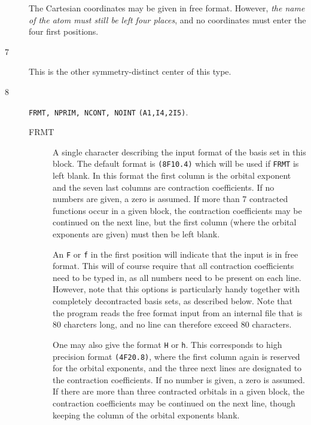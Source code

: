 \begin{description}
\begin{description}
\end{description}
The Cartesian coordinates may
be given in free format. However, {\em the name of the atom must still be
left four places}, and no coordinates must enter the four first
positions. 
\item[7] This is the other symmetry-distinct center of this type.
\item[8] \verb|FRMT, NPRIM, NCONT, NOINT| {\tt (A1,I4,2I5)}.
\begin{description}
\item[FRMT] A single character describing the input format of the
basis set in this block. The default format is {\tt (8F10.4)} which
will be used if {\tt FRMT} is left blank. In this format
the first column is the orbital exponent and the seven last columns
are contraction coefficients. If no numbers are given, a zero is
assumed. If more than 7 contracted functions occur in a given block,
the contraction coefficients may be continued on the next line, but
the first column (where the orbital exponents are given) must then be
left blank.

An {\tt F} or {\tt f} in the first
position will indicate that the input is in free format. This will of
course require that all contraction coefficients need to be typed in,
as all numbers need to be present on each line. However, note that
this options is particularly handy together with completely
decontracted basis sets, as described below. Note that the program
reads the free format input from an internal file that is 80 charcters
long, and no line can therefore exceed 80 characters.

One may also give the format {\tt H} or {\tt h}. This corresponds to
high precision format {\tt (4F20.8)}, where the first column again is
reserved for the orbital exponents, and the three next lines are
designated to the contraction coefficients. If no number is given, a zero
is assumed. If there are more than three contracted orbitals in a
given block, the contraction coefficients may be continued on the next
line, though keeping the column of the orbital exponents blank.


\end{description}
\end{description}
